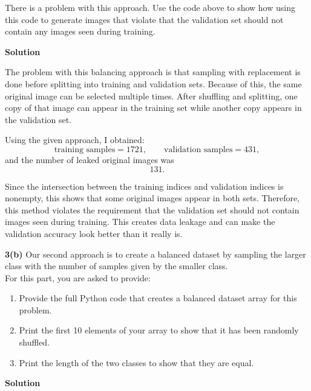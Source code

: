 \documentclass[11pt]{article}
\begin{document}
	There is a problem with this approach. Use the code above to show how using this code to generate images that violate that the validation set should not contain any images seen during training.
	
	\textbf{Solution}
	
	The problem with this balancing approach is that sampling with replacement is done before splitting into training and validation sets. Because of this, the same original image can be selected multiple times. After shuffling and splitting, one copy of that image can appear in the training set while another copy appears in the validation set.
	
	Using the given approach, I obtained:
	\[
	\text{training samples} = 1721, \qquad
	\text{validation samples} = 431,
	\]
	and the number of leaked original images was
	\[
	131.
	\]
	
	Since the intersection between the training indices and validation indices is nonempty, this shows that some original images appear in both sets. Therefore, this method violates the requirement that the validation set should not contain images seen during training. This creates data leakage and can make the validation accuracy look better than it really is.
	
	\textbf{3(b)} Our second approach is to create a balanced dataset by sampling the larger class with the number of samples given by the smaller class.\\
	
	For this part, you are asked to provide:
	
	\begin{enumerate}[label=\roman*.]
		\item Provide the full Python code that creates a balanced dataset array for this problem.
		
		\item Print the first 10 elements of your array to show that it has been randomly shuffled.
		
		\item Print the length of the two classes to show that they are equal.
	\end{enumerate}
	
	\textbf{Solution}
	
\end{document}
